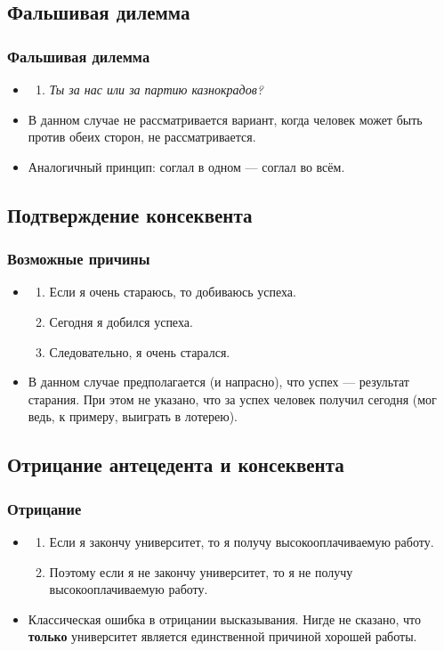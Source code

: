 \documentclass[compress,red]{beamer}
\begin{document}
\subsection{Фальшивая дилемма}
\begin{frame}[fragile]
  \frametitle{Фальшивая дилемма}
  \begin{itemize}
    \item
    \begin{enumerate}
      \item \emph{Ты за нас или за партию казнокрадов?}
    \end{enumerate}
    \item В данном случае не рассматривается вариант, когда человек может быть против обеих сторон, не рассматривается.
    \item Аналогичный принцип: соглал в одном --- соглал во всём.
  \end{itemize}
\end{frame}

\subsection{Подтверждение консеквента}
\begin{frame}[fragile]
  \frametitle{Возможные причины}
  \begin{itemize}
    \item
    \begin{enumerate}
      \item Если я очень стараюсь, то добиваюсь успеха.
      \item Сегодня я добился успеха.
      \item Следовательно, я очень старался.
    \end{enumerate}
    \item В данном случае предполагается (и напрасно), что успех --- результат старания. При этом не указано, что за успех человек получил сегодня (мог ведь, к примеру, выиграть в лотерею).
  \end{itemize}
\end{frame}

\subsection{Отрицание антецедента и консеквента}
\begin{frame}[fragile]
  \frametitle{Отрицание}
  \begin{itemize}
    \item
    \begin{enumerate}
      \item Если я закончу университет, то я получу высокооплачиваемую работу.
      \item Поэтому если я не закончу университет, то я не получу высокооплачиваемую работу.
    \end{enumerate}
    \item Классическая ошибка в отрицании высказывания. Нигде не сказано, что \textbf{только} университет является единственной причиной хорошей работы.
  \end{itemize}
\end{frame}
\end{document}
